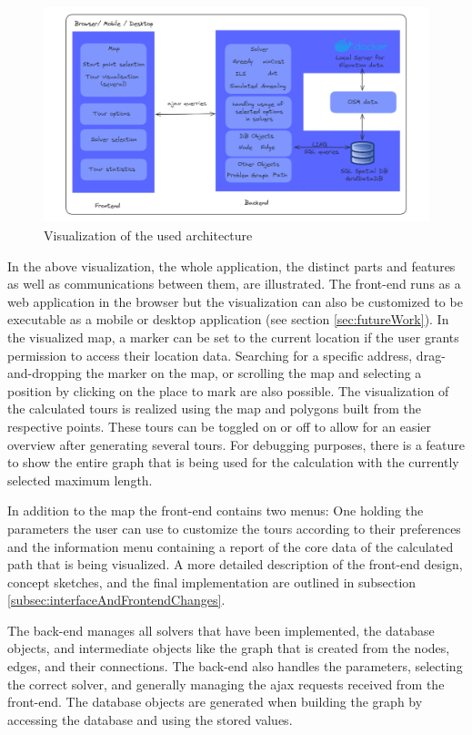 \begin{figure}[ht]
	\hspace*{-25 pt}
	\includegraphics[width=1.1\textwidth]{bilder/Implementation Architecture.png}
	\caption{Visualization of the used architecture}
	\label{fig:architecture}
\end{figure}


In the above visualization, the whole application, the distinct parts and features as well as communications between them, are illustrated. 
The front-end runs as a web application in the browser but the visualization can also be customized to be executable as a mobile or desktop application (see section \ref{sec:futureWork}). 
In the visualized map, a marker can be set to the current location if the user grants permission to access their location data.
Searching for a specific address, drag-and-dropping the marker on the map, or scrolling the map and selecting a position by clicking on the place to mark are also possible. 
The visualization of the calculated tours is realized using the map and polygons built from the respective points.
These tours can be toggled on or off to allow for an easier overview after generating several tours.
For debugging purposes, there is a feature to show the entire graph that is being used for the calculation with the currently selected maximum length.

In addition to the map the front-end contains two menus:
One holding the parameters the user can use to customize the tours according to their preferences and the information menu containing a report of the core data of the calculated path that is being visualized. 
A more detailed description of the front-end design, concept sketches, and the final implementation are outlined in subsection \ref{subsec:interfaceAndFrontendChanges}.

The back-end manages all solvers that have been implemented, the database objects, and intermediate objects like the graph that is created from the nodes, edges, and their connections. 
The back-end also handles the parameters, selecting the correct solver, and generally managing the ajax requests received from the front-end. 
The database objects are generated when building the graph by accessing the database and using the stored values.

